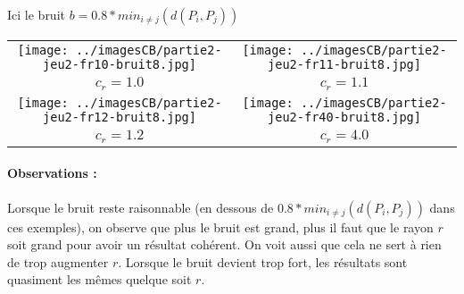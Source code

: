 \documentclass[11pt,a4paper]{article}
\begin{document}
\pagebreak

Ici le bruit $b=0.8*min_{i \neq j}(d(P_i,P_j))$
\begin{center}
\begin{tabular}{|c|c|}
\hline
\texttt{[image: ../imagesCB/partie2-jeu2-fr10-bruit8.jpg]} & \texttt{[image: ../imagesCB/partie2-jeu2-fr11-bruit8.jpg]} \\
$c_r=1.0$                                                             & $c_r=1.1$ \\
\hline
\texttt{[image: ../imagesCB/partie2-jeu2-fr12-bruit8.jpg]} & \texttt{[image: ../imagesCB/partie2-jeu2-fr40-bruit8.jpg]} \\
$c_r=1.2$                                                             & $c_r=4.0$ \\
\hline
\end{tabular}
\end{center}

\paragraph{Observations :} Lorsque le bruit reste raisonnable (en dessous de $0.8*min_{i \neq j}(d(P_i,P_j))$ dans ces exemples), on observe que plus le bruit est grand,
plus il faut que le rayon $r$ soit grand pour avoir un résultat cohérent. On voit aussi que cela ne sert à rien de trop augmenter $r$.
Lorsque le bruit devient trop fort, les résultats sont quasiment les mêmes quelque soit $r$.

\section{}
 
\end{document}
